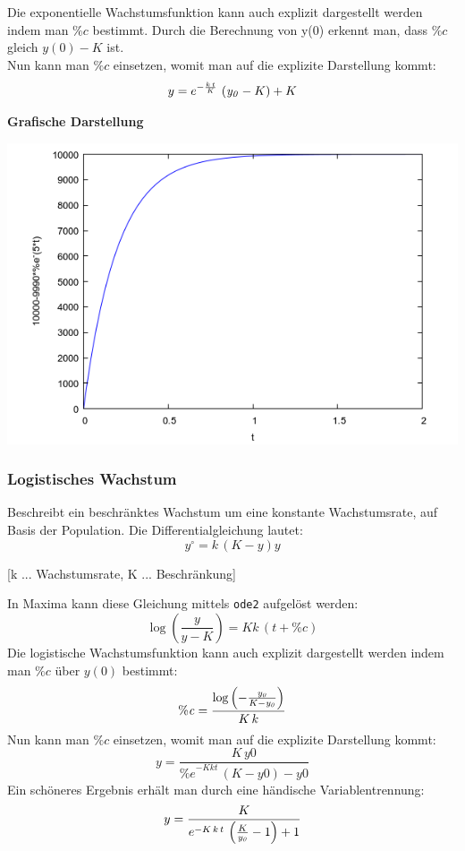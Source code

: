 \documentclass[a4paper,12pt]{article}
\begin{document}
Die exponentielle Wachstumsfunktion kann auch explizit dargestellt werden indem man $\%c$ bestimmt.
Durch die Berechnung von y(0) erkennt man, dass $\%c$ gleich $y(0) - K$ ist.\bigskip
\\
Nun kann man $\%c$ einsetzen, womit man auf die explizite Darstellung kommt:
$$y=e^ {- {\frac{k\,t}{K}} }\,\left({\it y_0}-K\right)+K$$
\begin{flushleft}
 \textbf{Grafische Darstellung}
\end{flushleft}
\includegraphics[scale=0.6]{beschraenktes-wachstum.png}

\subsubsection{Logistisches Wachstum}
Beschreibt ein beschränktes Wachstum um eine konstante Wachstumsrate, auf Basis der Population. 
Die Differentialgleichung lautet:
\[y^\circ=k\,\left( K-y\right) y\]
\begin{center}
 \small{[k ... Wachstumsrate, K ... Beschr\"ankung]}
\end{center}
In Maxima kann diese Gleichung mittels \texttt{ode2} aufgelöst werden:
$$\log{\left( \frac{y}{y-K}\right) }=Kk\,\left( t+\mathit{\%{}c}\right)$$
Die logistische Wachstumsfunktion kann auch explizit dargestellt werden indem man $\%c$ \"uber $y(0)$ bestimmt:
$${\it \%c}={{\log \left(-{{{\it y_0}}\over{K-{\it y_0}}}\right)}\over{K\,k}}$$
Nun kann man $\%c$ einsetzen, womit man auf die explizite Darstellung kommt:
$$y=\frac{K\,\mathit{y0}}{{{\%{}e}^{-Kkt}}\,\left( K-\mathit{y0}\right) -\mathit{y0}}$$
Ein sch\"oneres Ergebnis erh\"alt man durch eine h\"andische Variablentrennung:
$$y={{K}\over{e^ {- K\,k\,t }\,\left({{K}\over{{\it y_0}}}-1\right)+1}}$$
\end{document}
